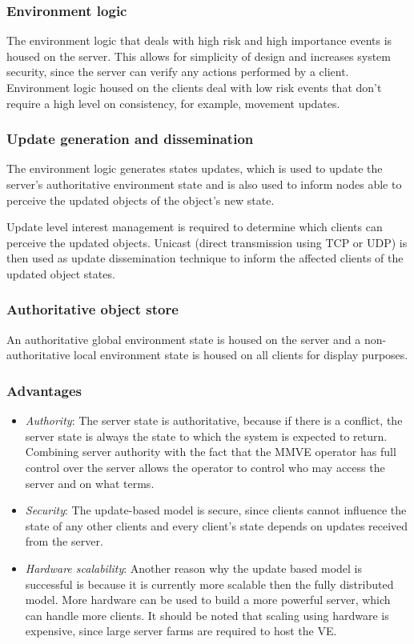 \subsubsection{Environment logic}
The environment logic that deals with high risk and high importance events is housed on the server. This allows for simplicity of design and increases system security, since the server can verify any actions performed by a client. Environment logic housed on the clients deal with low risk events that don't require a high level on consistency, for example, movement updates.

\subsubsection{Update generation and dissemination}

The environment logic generates states updates, which is used to update the server's authoritative environment state and is also used to inform nodes able to perceive the updated objects of the object's new state.

Update level interest management is required to determine which clients can perceive the updated objects. Unicast (direct transmission using TCP or UDP) is then used as update dissemination technique to inform the affected clients of the updated object states.

\subsubsection{Authoritative object store}
An authoritative global environment state is housed on the server and a  non-authoritative local environment state is housed on all clients for display purposes.

\subsubsection{Advantages}

\begin{itemize}
\item \emph{Authority}: The server state is authoritative, because if there is a conflict, the server state is always the state to which the system is expected to return. Combining server authority with the fact that the MMVE operator has full control over the server allows the operator to control who may access the server and on what terms.

\item \emph{Security}: The update-based model is secure, since clients cannot influence the state of any other clients and every client's state depends on updates received from the server.

\item \emph{Hardware scalability}: Another reason why the update based model is successful is because it is currently more scalable then the fully distributed model. More hardware can be used to build a more powerful server, which can handle more clients. It should be noted that scaling using hardware is expensive, since large server farms are required to host the VE.
\end{itemize}


